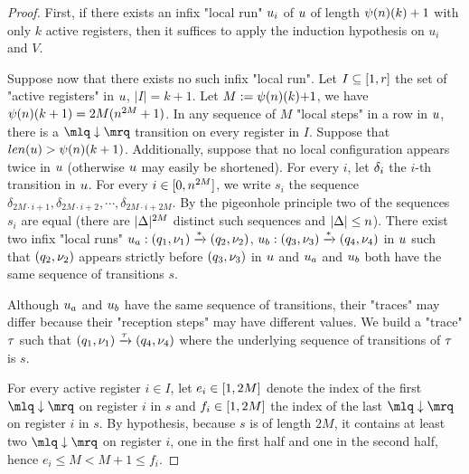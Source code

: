 \begin{proof}
	First, if there exists an infix "local run" $u_i$ of $u$ of length $\psi(n)(k)+1$ with only $k$ active registers, then it suffices to apply the induction hypothesis on $u_i$ and $V$.
	
	Suppose now that there exists no such infix "local run".
	Let $I \subseteq [1,r]$ the set of "active registers" in $u$, $|I| = k+1$. Let $M:= \psi(n)(k){+}1$, we have $\psi(n)(k+1) = 2M (n^{2M}+1)$. 
	In any sequence of $M$ "local steps" in a row in $u$, 
	there is a $\quotemarks{\enregact}$ transition on every register in $I$. Suppose that $\length{\localrun} > \towerfun(n)(k+1)$. Additionally, suppose that no local configuration appears twice in $u$ (otherwise $u$ may easily be shortened). For every $i$, let $\delta_i$ the $i$-th transition in $u$.
	For every $i \in [0,n^{2M}]$, we write $s_i$ the sequence $\delta_{2  M \cdot i+1}, \delta_{2  M \cdot i+2}, \cdots, \delta_{2 M \cdot i+2M}$.
	By the pigeonhole principle two of the sequences $s_i$ are equal (there are $|\Delta|^{2M}$ distinct such sequences and $|\Delta| \leq n$). 
	There exist two infix "local runs" $u_a: (q_1, \nu_1) \xrightarrow{*} (q_2, \nu_2)$, $u_b: (q_3, \nu_3) \xrightarrow{*} (q_4, \nu_4)$ in $u$ such that $(q_2,\nu_2)$ appears strictly before $(q_3,\nu_3)$ in $u$ and $u_a$ and $u_b$ both have the same sequence of transitions $s$.
	
	Although $u_a$ and $u_b$ have the same sequence of transitions, their "traces" may differ because their "reception steps" may have different values.
	We build a "trace" $\tau$ such that $(q_1,\nu_1) \xrightarrow{\tau} (q_4, \nu_4)$ where the underlying sequence of transitions of $\tau$ is $s$.
	
	For every active register $i \in I$, let $e_i \in [1,2M]$ denote the index of the first $\quotemarks{\enregact}$ on register $i$ in $s$ and $f_i \in [1,2M]$ the index of the last $\quotemarks{\enregact}$ on register $i$ in $s$. By hypothesis, because $s$ is of length $2M$, it contains at least two $\quotemarks{\enregact}$ on register $i$, one in the first half and one in the second half, hence $e_i \leq M < M +1 \leq f_i$. 
	

\end{proof}
